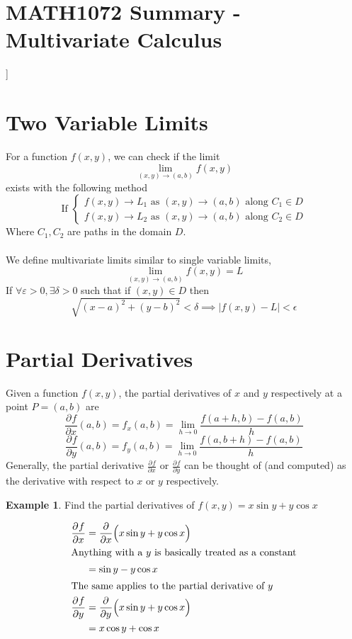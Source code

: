 \documentclass{article}
\theoremstyle{remark}
\theoremstyle{definition}
\newtheorem{example}{Example}
\begin{document}
\begin{landscape}
\begin{multicols*}{3}
   \section*{MATH1072 Summary - Multivariate Calculus}
   ]
   \section*{Two Variable Limits}
   For a function \( f(x,y) \), we can check if the limit
   \[ 
     \displaystyle \lim_{(x,y) \to (a,b)} f(x,y)
   \]
   exists with the following method
   \[
       \text{If } \displaystyle \begin{cases}
       f(x,y) \to L_1 \text{ as } (x,y) \to (a,b) \text{ along }     C_1
       \in D\\
       f(x,y) \to L_2 \text{ as } (x,y) \to (a,b) \text { along } C_2
       \in  D
     \end{cases}
   \]
   Where \( C_1, C_2 \) are paths in the domain \( D \).\\\\
   We define multivariate limits similar to single variable limits,
   \[ 
     \displaystyle \lim_{(x,y) \to (a,b)} f(x,y) = L
   \]
   If \( \forall \varepsilon > 0, \exists \delta > 0  \) such that if \( (x,y)
   \in D\) then
   \[ 
     \sqrt{(x-a)^2 + (y-b)^2} < \delta \implies |f(x,y) - L| < \epsilon
   \]

   \section*{Partial Derivatives}
   Given a function \( f(x,y) \), the partial derivatives of \( x \) and \(
   y \) respectively at a point \( P = (a,b) \) are
   \[ 
     \frac{\partial^{}{f}}{\partial{x}^{}}(a,b) = f_x(a,b) = \displaystyle
     \lim_{h \to 0} \frac{f(a+h, b) - f(a,b)}{h}
   \]
   \[ 
     \frac{\partial^{}{f}}{\partial{y}^{}}(a,b) = f_y(a,b) = \displaystyle
     \lim_{h \to 0} \frac{f(a, b+h) - f(a,b)}{h}
   \]
   Generally, the partial derivative \( \displaystyle \frac{\partial^{}{f}}{\partial{x}^{}}
   \) or \( \displaystyle \frac{\partial^{}{f}}{\partial{y}^{}}  \) can be thought of (and computed) as the derivative with respect to \(
   x \) or \( y \) respectively.
   \begin{example}
     Find the partial derivatives of \( f(x,y) = x\sin y + y \cos x \)
   \end{example}
   \begin{align*}
     \frac{\partial^{}{f}}{\partial{x}^{}} &= \frac{\partial}{\partial{x}}\Big
   (x\sin y + y\cos x\Big)\\
   \intertext{Anything with a \( y \) is basically treated as a constant}
     &= \sin y - y \cos x\\
     \intertext{The same applies to the partial derivative of \( y \)}
     \frac{\partial^{}{f}}{\partial{y}^{}}
     &= \frac{\partial^{}{}}{\partial{y}^{}}\Big(x\sin y + y \cos x\Big)\\
     &= x\cos y + \cos x
   \end{align*}

\end{multicols*}
\end{landscape}
\end{document}
